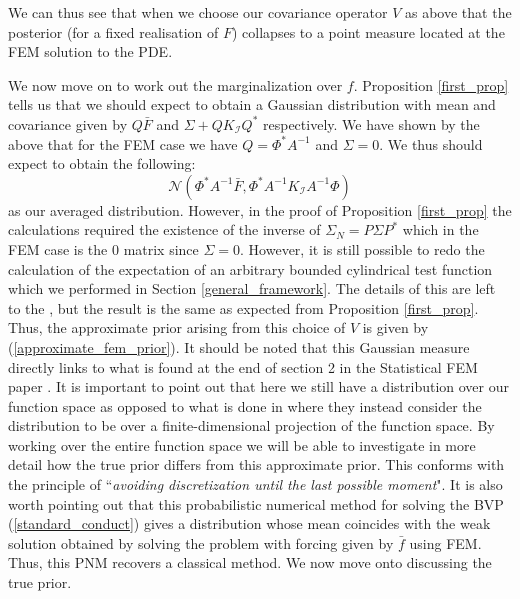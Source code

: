 We can thus see that when we choose our covariance operator $V$ as above that the posterior (for a fixed realisation of $F$) collapses to a point measure located at the FEM solution to the PDE.

We now move on to work out the marginalization over $f$. Proposition \textcolor{blue}{\ref{first_prop}} tells us that we should expect to obtain a Gaussian distribution with mean and covariance given by $Q\bar{F}$ and $\Sigma+QK_{\mathcal{I}}Q^{*}$ respectively. We have shown by the above that for the FEM case we have $Q=\Phi^{*}A^{-1}$ and $\Sigma=0$. We thus should expect to obtain the following:
\begin{equation}
    \label{approximate_fem_prior}
    \mathcal{N}(\Phi^{*}A^{-1}\bar{F},\Phi^{*}A^{-1}K_{\mathcal{I}}A^{-1}\Phi)
\end{equation}
as our averaged distribution. However, in the proof of Proposition \textcolor{blue}{\ref{first_prop}} the calculations required the existence of the inverse of $\Sigma_{N}=P\Sigma P^{*}$ which in the FEM case is the $0$ matrix since $\Sigma=0$. However, it is still possible to redo the calculation of the expectation of an arbitrary bounded cylindrical test function which we performed in Section \textcolor{blue}{\ref{general_framework}}. The details of this are left to the \textcolor{blue}{}, but the result is the same as expected from Proposition \textcolor{blue}{\ref{first_prop}}. Thus, the approximate prior arising from this choice of $V$ is given by (\ref{approximate_fem_prior}). It should be noted that this Gaussian measure directly links to what is found at the end of section 2 in the Statistical FEM paper \textcolor{blue}{\citep{girolami2019statistical}}. It is important to point out that here we still have a distribution over our function space as opposed to what is done in \textcolor{blue}{\citep{girolami2019statistical}} where they instead consider the distribution to be over a finite-dimensional projection of the function space. By working over the entire function space we will be able to investigate in more detail how the true prior differs from this approximate prior. This conforms with the principle of ``\textit{avoiding discretization until the last possible moment}". It is also worth pointing out that this probabilistic numerical method for solving the BVP (\ref{standard_conduct}) gives a distribution whose mean coincides with the weak solution obtained by solving the problem with forcing given by $\bar{f}$ using FEM. Thus, this PNM recovers a classical method. We now move onto discussing the true prior.


